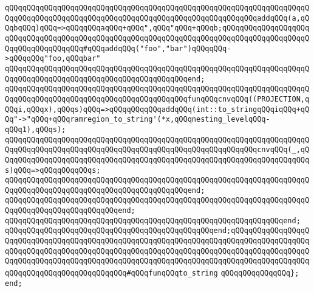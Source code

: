 \verb|qQQqqQQqqQQqqQQqqQQqqQQqqQQqqQQqqQQqqQQqqQQqqQQqqQQqqQQqqQQqqQQqqQQqqQQqqQQqqQQqqQQqqQQqqQQqqQQqqQQqqQQqqQQqqQQqqQQqqQQqqQQqqQQqaddqQQq(a,qQQqbqQQq)qQQq=>qQQqqQQqaqQQq+qQQq",qQQq"qQQq+qQQqb;qQQqqQQqqQQqqQQqqQQqqQQqqQQqqQQqqQQqqQQqqQQqqQQqqQQqqQQqqQQqqQQqqQQqqQQqqQQqqQQqqQQqqQQqqQQqqQQqqQQqqQQqqQQq#qQQqaddqQQq("foo","bar")qQQqqQQq->qQQqqQQq"foo,qQQqbar"|\newline
\verb|qQQqqQQqqQQqqQQqqQQqqQQqqQQqqQQqqQQqqQQqqQQqqQQqqQQqqQQqqQQqqQQqqQQqqQQqqQQqqQQqqQQqqQQqqQQqqQQqqQQqqQQqqQQqqQQqend;|\newline
\newline
\verb|qQQqqQQqqQQqqQQqqQQqqQQqqQQqqQQqqQQqqQQqqQQqqQQqqQQqqQQqqQQqqQQqqQQqqQQqqQQqqQQqqQQqqQQqqQQqqQQqqQQqqQQqqQQqqQQqfunqQQqcnvqQQq((PROJECTION,qQQqi,qQQqx),qQQqs)qQQq=>qQQqqQQqqQQqaddqQQq(int::to_stringqQQqiqQQq+qQQq"->"qQQq+qQQqramregion_to_string'(*x,qQQqnesting_levelqQQq-qQQq1),qQQqs);|\newline
\verb|qQQqqQQqqQQqqQQqqQQqqQQqqQQqqQQqqQQqqQQqqQQqqQQqqQQqqQQqqQQqqQQqqQQqqQQqqQQqqQQqqQQqqQQqqQQqqQQqqQQqqQQqqQQqqQQqqQQqqQQqqQQqqQQqcnvqQQq(_,qQQqqQQqqQQqqQQqqQQqqQQqqQQqqQQqqQQqqQQqqQQqqQQqqQQqqQQqqQQqqQQqqQQqqQQqs)qQQq=>qQQqqQQqqQQqs;|\newline
\verb|qQQqqQQqqQQqqQQqqQQqqQQqqQQqqQQqqQQqqQQqqQQqqQQqqQQqqQQqqQQqqQQqqQQqqQQqqQQqqQQqqQQqqQQqqQQqqQQqqQQqqQQqqQQqqQQqend;|\newline
\verb|qQQqqQQqqQQqqQQqqQQqqQQqqQQqqQQqqQQqqQQqqQQqqQQqqQQqqQQqqQQqqQQqqQQqqQQqqQQqqQQqqQQqqQQqqQQqqQQqend;|\newline
\verb|qQQqqQQqqQQqqQQqqQQqqQQqqQQqqQQqqQQqqQQqqQQqqQQqqQQqqQQqqQQqqQQqend;|\newline
\verb|qQQqqQQqqQQqqQQqqQQqqQQqqQQqqQQqqQQqqQQqqQQqqQQqend;qQQqqQQqqQQqqQQqqQQqqQQqqQQqqQQqqQQqqQQqqQQqqQQqqQQqqQQqqQQqqQQqqQQqqQQqqQQqqQQqqQQqqQQqqQQqqQQqqQQqqQQqqQQqqQQqqQQqqQQqqQQqqQQqqQQqqQQqqQQqqQQqqQQqqQQqqQQqqQQqqQQqqQQqqQQqqQQqqQQqqQQqqQQqqQQqqQQqqQQqqQQqqQQqqQQqqQQqqQQqqQQqqQQqqQQqqQQqqQQqqQQqqQQqqQQqqQQq#qQQqfunqQQqto_string|\newline
\verb|qQQqqQQqqQQqqQQq};|\newline
\verb|end;|\newline
\newline

